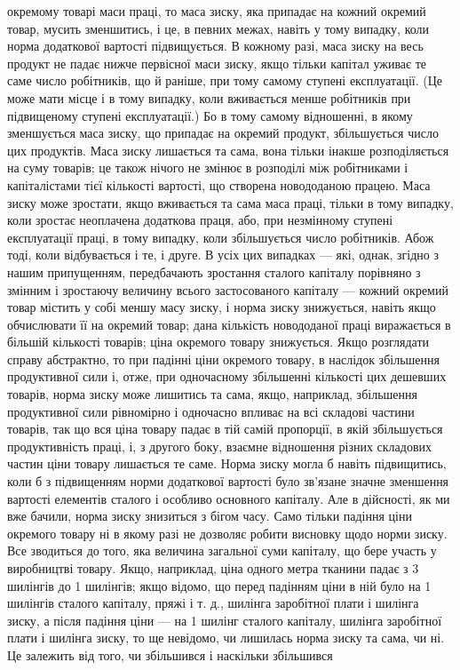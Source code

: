 \parcont{}  %
окремому товарі маси праці, то маса зиску, яка припадає на кожний окремий товар, мусить зменшитись,
і це, в певних межах, навіть у тому випадку, коли норма додаткової вартості підвищується. В кожному
разі, маса зиску на весь продукт не падає нижче первісної маси зиску, якщо тільки капітал уживає те
саме число робітників, що й раніше, при тому самому ступені експлуатації. (Це може мати місце і в
тому випадку, коли вживається менше робітників при підвищеному ступені експлуатації.) Бо в тому
самому відношенні, в якому зменшується маса зиску, що припадає на окремий продукт, збільшується
число цих продуктів. Маса зиску лишається та сама, вона тільки інакше розподіляється на суму
товарів; це також нічого не змінює в розподілі між робітниками і капіталістами тієї кількості
вартості, що створена новододаною працею. Маса зиску може зростати, якщо вживається та сама маса
праці, тільки в тому випадку, коли зростає неоплачена додаткова праця, або, при незмінному ступені
експлуатації праці, в тому випадку, коли збільшується число робітників. Абож тоді, коли відбувається
і те, і друге. В усіх цих випадках — які, однак, згідно з нашим припущенням, передбачають зростання
сталого капіталу порівняно з змінним і зростаючу величину всього застосованого капіталу — кожний
окремий товар містить у собі меншу масу зиску, і норма зиску знижується, навіть якщо обчислювати її
на окремий товар; дана кількість новододаної праці виражається в більшій кількості товарів; ціна
окремого товару знижується. Якщо
розглядати справу абстрактно, то при падінні ціни окремого товару, в наслідок збільшення
продуктивної сили і, отже, при одночасному збільшенні кількості цих дешевших товарів, норма зиску
може лишитись та сама, якщо, наприклад, збільшення продуктивної сили рівномірно і одночасно впливає
на всі складові частини товарів, так що вся ціна товару падає в тій самій пропорції, в якій
збільшується продуктивність праці, і, з другого боку, взаємне відношення різних складових частин
ціни товару лишається те саме. Норма зиску могла б навіть підвищитись, коли б з підвищенням норми
додаткової вартості було зв’язане значне зменшення вартості елементів сталого і особливо основного
капіталу. Але в дійсності, як ми вже бачили, норма зиску знизиться з бігом часу. Само тільки падіння
ціни окремого товару ні в якому разі не дозволяє робити висновку щодо норми зиску. Все зводиться до
того, яка величина загальної суми капіталу, що бере участь у виробництві товару. Якщо, наприклад,
ціна одного метра тканини падає з 3 шилінгів до 1   шилінгів; якщо відомо, що перед падінням ціни
в ній було на 1   шилінгів сталого капіталу, пряжі і т. д.,   шилінга заробітної плати і 
шилінга зиску, а після падіння ціни — на 1 шилінг сталого капіталу,   шилінга заробітної плати і
  шилінга зиску, то ще невідомо, чи лишилась норма зиску та сама, чи ні. Це залежить від того, чи
збільшився і наскільки збільшився
\parbreak{}  %
